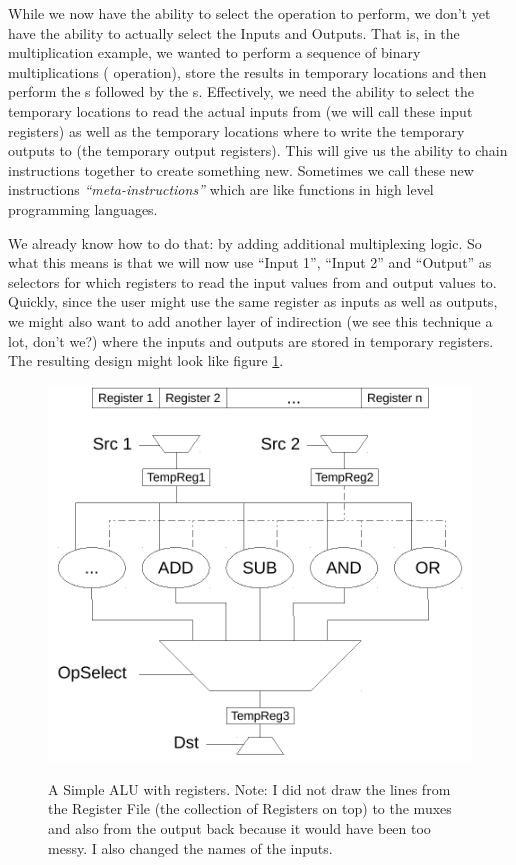 While we now have the ability to select the operation to perform, we don’t yet have the ability to actually select the Inputs and Outputs. That is, in the multiplication example, we wanted to perform a sequence of binary multiplications ( operation), store the results in temporary locations and then perform the s followed by the s. Effectively, we need the ability to select the temporary locations to read the actual inputs from (we will call these input registers) as well as the temporary locations where to write the temporary outputs to (the temporary output registers). This will give us the ability to chain instructions together to create something new. Sometimes we call these new instructions {\em ``meta-instructions''} which are like functions in high level programming languages.

We already know how to do that: by adding additional multiplexing logic. So what this means is that we will now use ``Input 1'', ``Input 2'' and ``Output'' as selectors for which registers to read the input values from and output values to. Quickly, since the user might use the same register as inputs as well as outputs, we might also want to add another layer of indirection (we see this technique a lot, don’t we?) where the inputs and outputs are stored in temporary registers. The resulting design might look like figure \ref{fig:IntroToAssembly:SimpleALUWithRegisters}.

\begin{figure}
\centering
\includegraphics[width=5in]{IntroToAssembly/images/SimpleALUWithRegisters}
\label{fig:IntroToAssembly:SimpleALUWithRegisters}
\caption{A Simple ALU with registers. Note: I did not draw the lines from the Register File (the collection of Registers on top) to the muxes and also from the output back because it would have been too messy. I also changed the names of the inputs.}
\end{figure}

